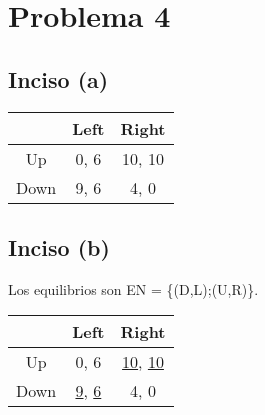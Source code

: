 \documentclass{article}
\newcommand{\ulcolor}[2][Red]{\setulcolor{#1}\ul{#2}}
\begin{document}
    \section*{Problema 4}
        \subsection*{Inciso (a)}
            \begin{table}[H]
                \begin{tabular}{|c|c|c|}
                    \hline
                        & Left & Right \\ \hline
                    Up   & 0, 6 & 10, 10 \\ 
                    Down   & 9, 6 & 4, 0 \\ \hline
                \end{tabular}
            \end{table}
        \subsection*{Inciso (b)}
            Los equilibrios son EN = \{(D,L);(U,R)\}.
            \begin{table}[H]
                \begin{tabular}{|c|c|c|}
                    \hline
                        & Left & Right \\ \hline
                    Up   & 0, 6 & \ulcolor[Red]{10}, \ulcolor[Blue]{10} \\ 
                    Down   & \ulcolor[Red]{9}, \ulcolor[Blue]{6} & 4, 0 \\ \hline
                \end{tabular}
            \end{table}
\end{document}
